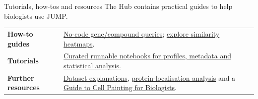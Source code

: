 \documentclass[aspectratio=169,10pt]{beamer}
\begin{document}
\begin{frame}[label={sec:org0000008}]{Tutorials, how-tos and resources}
The Hub contains practical guides to help biologists use JUMP.

\medskip
\begin{tabular}{@{}>{\raggedright\arraybackslash}p{}>{\raggedright\arraybackslash}p{}@{}}
\textbf{How-to guides} & \href{https://broadinstitute.github.io/jump_hub/howto/interactive/1_jumprr_steps.html}{No-code gene/compound queries}; \href{https://broadinstitute.github.io/jump_hub/howto/interactive/0_overview.html\#morpheus}{explore similarity heatmaps}. \\[1em]
\textbf{Tutorials} & \href{https://broadinstitute.github.io/jump_hub/howto/notebooks/0_overview.html}{Curated runnable notebooks for profiles, metadata and statistical analysis.} \\[1em]
\textbf{Further resources} & \href{https://broadinstitute.github.io/jump_hub/explanations/data_description.html}{Dataset explanations}, \href{https://broadinstitute.github.io/jump_hub/howto/notebooks/17_mislocus_example.html}{protein-localisation analysis} and a \href{https://ciminilab.github.io/GuideToCellPainting/}{Guide to Cell Painting for Biologists}.
\end{tabular}\par\bigskip
\end{frame}
\end{document}
